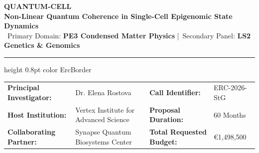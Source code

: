 \documentclass[11pt,a4paper]{article}
\begin{document}
\begin{tcolorbox}[summarybox]
  \begin{minipage}[t]{0.70\textwidth}
    {\color{ErcNavy}\Huge \bfseries QUANTUM-CELL} \\[4pt]
    {\color{ErcTeal}\Large \bfseries Non-Linear Quantum Coherence in Single-Cell Epigenomic State Dynamics} \\[6pt]
    {\color{ErcDark}\small \faFlask\ Primary Domain: \textbf{PE3 Condensed Matter Physics} \quad |\quad \faDna\ Secondary Panel: \textbf{LS2 Genetics \& Genomics}}
  \end{minipage}%
  \hfill
  \begin{minipage}[t]{0.26\textwidth}
    \raggedleft
  \end{minipage}

  \vspace{8pt}
  \hrule height 0.8pt color ErcBorder
  \vspace{8pt}

  \begin{tabularx}{\textwidth}{@{}l X l X@{}}
    \textbf{\color{ErcNavy}Principal Investigator:} & Dr. Elena Rostova & \textbf{\color{ErcNavy}Call Identifier:} & ERC-2026-StG \\
    \textbf{\color{ErcNavy}Host Institution:} & Vertex Institute for Advanced Science & \textbf{\color{ErcNavy}Proposal Duration:} & 60 Months \\
    \textbf{\color{ErcNavy}Collaborating Partner:} & Synapse Quantum Biosystems Center & \textbf{\color{ErcNavy}Total Requested Budget:} & \euro 1,498,500 \\
  \end{tabularx}
\end{tcolorbox}

\vspace{10pt}
\end{document}
